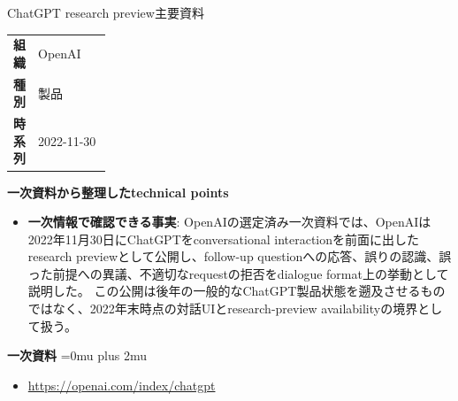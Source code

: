 \begin{technicalnote}{ChatGPT research preview}{主要資料}
\begingroup
\begin{tabularx}{\linewidth}{@{}>{\bfseries}p{0.22\linewidth}X@{}}
組織 & OpenAI \\
種別 & 製品 \\
時系列 & 2022-11-30 \\
\end{tabularx}
\smallskip
{\bfseries 一次資料から整理したtechnical points}
\begin{itemize}[leftmargin=1.5em,itemsep=0.35em]
\item \textbf{一次情報で確認できる事実}: OpenAIの選定済み一次資料では、OpenAIは2022年11月30日にChatGPTをconversational interactionを前面に出したresearch previewとして公開し、follow-up questionへの応答、誤りの認識、誤った前提への異議、不適切なrequestの拒否をdialogue format上の挙動として説明した。 この公開は後年の一般的なChatGPT製品状態を遡及させるものではなく、2022年末時点の対話UIとresearch-preview availabilityの境界として扱う。
\end{itemize}
\begin{minipage}{\linewidth}
\begin{samepage}
{\bfseries 一次資料}
\begingroup\sloppy
\Urlmuskip=0mu plus 2mu\relax
\begin{itemize}[leftmargin=1.5em,itemsep=0.25em]
\item {\scriptsize\url{https://openai.com/index/chatgpt}}
\end{itemize}
\endgroup
\end{samepage}
\end{minipage}
\endgroup
\end{technicalnote}
\medskip

